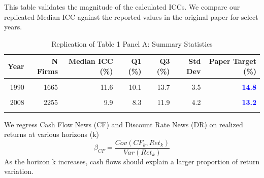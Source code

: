 \documentclass[
]{article}
\author{}
\date{\vspace{-2.5em}}
\begin{document}
This table validates the magnitude of the calculated ICCs. We compare
our replicated Median ICC against the reported values in the original
paper for select years.

\begin{table}[!h]

\caption{\label{tab:table1}Replication of Table 1 Panel A: Summary Statistics}
\centering
\begin{tabular}[t]{rrrrrr>{}r}
\toprule
Year & N Firms & Median ICC (\%) & Q1 (\%) & Q3 (\%) & Std Dev & Paper Target (\%)\\
\midrule
\cellcolor{gray!6}{1985} & \cellcolor{gray!6}{1568} & \cellcolor{gray!6}{12.3} & \cellcolor{gray!6}{10.9} & \cellcolor{gray!6}{13.8} & \cellcolor{gray!6}{2.7} & \textcolor{blue}{\textbf{\cellcolor{gray!6}{15.8}}}\\
1990 & 1665 & 11.6 & 10.1 & 13.7 & 3.5 & \textcolor{blue}{\textbf{14.8}}\\
\cellcolor{gray!6}{2000} & \cellcolor{gray!6}{2436} & \cellcolor{gray!6}{10.3} & \cellcolor{gray!6}{8.0} & \cellcolor{gray!6}{12.6} & \cellcolor{gray!6}{4.4} & \textcolor{blue}{\textbf{\cellcolor{gray!6}{15.5}}}\\
2008 & 2255 & 9.9 & 8.3 & 11.9 & 4.2 & \textcolor{blue}{\textbf{13.2}}\\
\cellcolor{gray!6}{2010} & \cellcolor{gray!6}{2120} & \cellcolor{gray!6}{8.8} & \cellcolor{gray!6}{7.4} & \cellcolor{gray!6}{10.4} & \cellcolor{gray!6}{3.5} & \textcolor{blue}{\textbf{\cellcolor{gray!6}{11.5}}}\\
\bottomrule
\end{tabular}
\end{table}

We regress Cash Flow News (CF) and Discount Rate News (DR) on realized
returns at various horizons (k)
\[\beta_{CF} = \frac{Cov(CF_k, Ret_k)}{Var(Ret_k)}\] As the horizon k
increases, cash flows should explain a larger proportion of return
variation.
\end{document}
